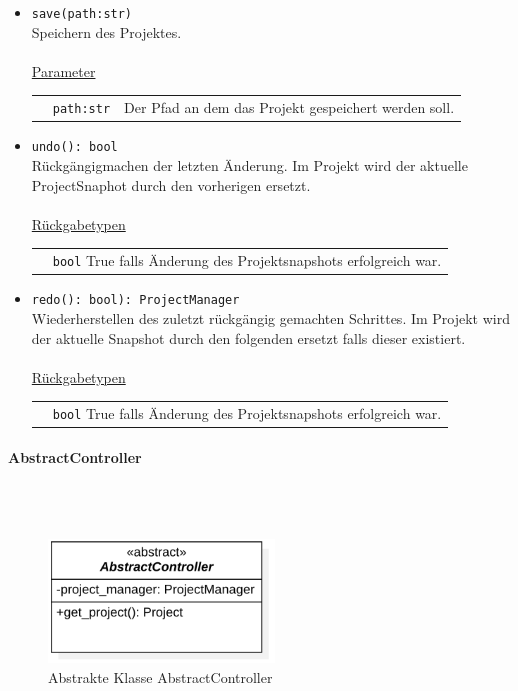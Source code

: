\documentclass{article}
\newcommand{\classheader}[2][]{\paragraph{#2}
\mbox{}\textit{#1}\\\\}
\begin{document}
\begin{itemize}
\item \texttt{save(path:str)}\\ Speichern des Projektes.\\\\
\underline{{Parameter}}\\
\begin{tabular}{lll}
 & \texttt{path:str} & Der Pfad an dem das Projekt gespeichert werden soll. \\
\end{tabular}
\item \texttt{undo(): bool}\\ Rückgängigmachen der letzten Änderung. Im Projekt wird der aktuelle ProjectSnaphot durch den vorherigen ersetzt.\\\\
\underline{{Rückgabetypen}}\\
\begin{tabular}{lp{10.7cm}}
 & \texttt{bool}  True falls Änderung des Projektsnapshots erfolgreich war.\\
\end{tabular}
\item \texttt{redo(): bool): ProjectManager}\\ Wiederherstellen des zuletzt rückgängig gemachten Schrittes. Im Projekt wird der aktuelle Snapshot durch den folgenden ersetzt falls dieser existiert.\\\\
\underline{{Rückgabetypen}}\\
\begin{tabular}{lp{10.7cm}}
 & \texttt{bool}  True falls Änderung des Projektsnapshots erfolgreich war.\\
\end{tabular}
\end{itemize}


\newpage
\classheader{AbstractController}\label{cls:AbstractController}
\begin{figure}[H]%
    \centering
    \includegraphics[width=6cm]{entwurf/Floriane/AbstractController.png}
    \caption{Abstrakte Klasse AbstractController}
\end{figure}
\end{document}
